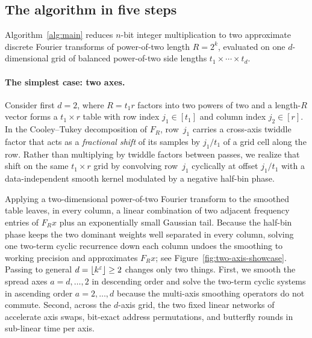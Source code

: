 \subsection{The algorithm in five steps}\label{sec:overview-five-steps}

Algorithm~\ref{alg:main} reduces $n$-bit integer multiplication to two approximate discrete Fourier transforms of power-of-two length $R=2^k$, evaluated on one $d$-dimensional grid of balanced power-of-two side lengths $t_1\times\cdots\times t_d$.

\paragraph{The simplest case: two axes.}
Consider first $d=2$, where $R=t_1 r$ factors into two powers of two and a length-$R$ vector forms a $t_1\times r$ table with row index $j_1\in[t_1]$ and column index $j_2\in[r]$. In the Cooley--Tukey decomposition of $F_R$, row~$j_1$ carries a cross-axis twiddle factor that acts as a \emph{fractional shift} of its samples by $j_1/t_1$ of a grid cell along the row. Rather than multiplying by twiddle factors between passes, we realize that shift on the same $t_1\times r$ grid by convolving row~$j_1$ cyclically at offset $j_1/t_1$ with a data-independent smooth kernel modulated by a negative half-bin phase.

Applying a two-dimensional power-of-two Fourier transform to the smoothed table leaves, in every column, a linear combination of two adjacent frequency entries of $F_R x$ plus an exponentially small Gaussian tail. Because the half-bin phase keeps the two dominant weights well separated in every column, solving one two-term cyclic recurrence down each column undoes the smoothing to working precision and approximates $F_R x$; see Figure~\ref{fig:two-axis-showcase}. Passing to general $d=\lfloor k^\varepsilon\rfloor\ge 2$ changes only two things. First, we smooth the spread axes $a=d,\dots,2$ in descending order and solve the two-term cyclic systems in ascending order $a=2,\dots,d$ because the multi-axis smoothing operators do not commute. Second, across the $d$-axis grid, the two fixed linear networks of~\cite{OAI26} accelerate axis swaps, bit-exact address permutations, and butterfly rounds in sub-linear time per axis.


